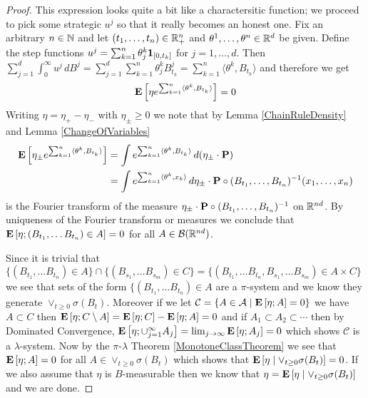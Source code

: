 \begin{proof}
This expression looks quite a bit like a charactersitic function; we proceed to pick some strategic $u^j$ so that it really becomes an honest one.  Fix an arbitrary $n \in \naturals$ and let $(t_1, \dotsc, t_n) \in \reals^n_+$ and $\theta^1, \dotsc, \theta^n \in \reals^d$ be given.  Define the step functions $u^j = \sum_{k=1}^n \theta^k_j \characteristic{[0,t_k]}$ for $j=1, \dotsc, d$. Then $\sum_{j=1}^d \int_0^\infty u^j \, dB^j = \sum_{j=1}^d\sum_{k=1}^n \theta^k_j B^j_{t_k} = \sum_{k=1}^n \langle \theta^k , B_{t_k}\rangle$ and therefore we get
\begin{align*}
\expectation{\eta e^{\sum_{k=1}^n \langle \theta^k , B_{t_k}\rangle}} = 0
\end{align*}
Writing $\eta = \eta_+ - \eta_-$ with $\eta_\pm \geq 0$ we note that by Lemma \ref{ChainRuleDensity} and Lemma \ref{ChangeOfVariables}
\begin{align*}
\expectation{\eta_\pm e^{\sum_{k=1}^n \langle \theta^k , B_{t_k}\rangle}} &= \int e^{\sum_{k=1}^n \langle \theta^k , B_{t_k}\rangle} \, d (\eta_\pm \cdot \probabilityop) \\
&= \int e^{\sum_{k=1}^n \langle \theta^k , x_k \rangle} \, d \pushforward{(B_{t_1}, \dotsc , B_{t_n})}{\eta_\pm \cdot \probabilityop}(x_1, \dotsc, x_n)
\end{align*} 
is the Fourier transform of the measure $\pushforward{(B_{t_1}, \dotsc , B_{t_n})}{\eta_\pm \cdot \probabilityop}$ on $\reals^{nd}$.  By uniqueness of the Fourier transform or measures we conclude that $\expectation{\eta ; (B_{t_1}, \dotsc B_{t_n}) \in A} = 0$ for all $A \in \mathcal{B}(\reals^{nd})$.  

Since it is trivial that $\lbrace (B_{t_1}, \dotsc B_{t_n}) \in A \rbrace \cap  \lbrace (B_{s_1}, \dotsc B_{s_m}) \in C \rbrace =  \lbrace (B_{t_1}, \dotsc B_{t_n}, B_{s_1}, \dotsc B_{s_m}) \in A \times C \rbrace$ we see that sets of the form $\lbrace (B_{t_1}, \dotsc B_{t_n}) \in A$ are a $\pi$-system and we know they generate $\vee_{t \geq 0} \sigma(B_t)$.  Moreover if we let $\mathcal{C} = \lbrace A \in \mathcal{A} \mid \expectation{\eta ; A} = 0\rbrace$ 
we have $A \subset C$ then $\expectation{\eta ; C \setminus A}  = \expectation{\eta ; C} - \expectation{\eta ; A} = 0$ and if $A_1 \subset A_2 \subset \dotsb$ then by Dominated Convergence, 
$\expectation{\eta ; \cup_{j=1}^\infty A_j} = \lim_{j \to \infty} \expectation{\eta ; A_j} = 0$ which shows $\mathcal{C}$ is a $\lambda$-system.  Now by the $\pi$-$\lambda$ Theorem \ref{MonotoneClassTheorem} we see that $\expectation{\eta ; A }=0$ for all $A \in \vee_{t \geq 0} \sigma(B_t)$ which shows that $\cexpectationlong{\vee_{t \geq 0} \sigma(B_t)}{\eta} = 0$.  If we also assume that $\eta$ is $B$-measurable then we know that $\eta = \cexpectationlong{\vee_{t \geq 0} \sigma(B_t)}{\eta} $ and we are done.
\end{proof}

